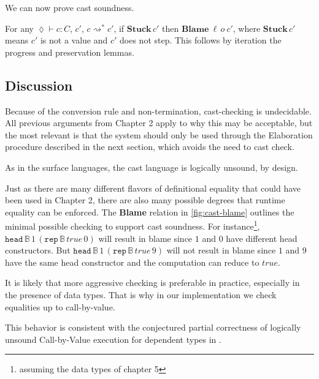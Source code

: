 
We can now prove cast soundness.

For any $\lozenge\vdash c:C$, $c'$, $c\rightsquigarrow^{*}c'$,
if $\textbf{Stuck}\,c'$ then $\textbf{Blame}\:\ensuremath{\ell}\,o\:c'$,
where $\textbf{Stuck}\,c'$ means $c'$ is not a value and $c'$ does
not step. This follows by iteration the progress and preservation
lemmas.

\subsection{Discussion}



Because of the conversion rule and non-termination, cast-checking
is undecidable. All previous arguments from Chapter 2 apply to why
this may be acceptable, but the most relevant is that the system should
only be used through the Elaboration procedure described in the next
section, which avoids the need to cast check.


As in the surface languages, the cast language is logically unsound,
by design.

Just as there are many different flavors of definitional equality
that could have been used in Chapter 2, there are also many possible
degrees that runtime equality can be enforced. The \textbf{Blame}
relation in \ref{fig:cast-blame} outlines the minimal possible checking
to support cast soundness. For instance\footnote{assuming the data types of chapter 5},
$\mathtt{head}\,\mathbb{B}\,1\,\left(\mathtt{rep}\,\mathbb{B}\,true\,0\right)$
will result in blame since $1$ and $0$ have different head constructors.
But $\mathtt{head}\,\mathbb{B}\,1\,\left(\mathtt{rep}\,\mathbb{B}\,true\,9\right)$
will not result in blame since $1$ and $9$ have the same head constructor
and the computation can reduce to $true$. 

It is likely that more aggressive checking is preferable in practice,
especially in the presence of data types. That is why in our implementation
we check equalities up to call-by-value. 

This behavior is consistent with the conjectured partial correctness
of logically unsound Call-by-Value execution for dependent types in
\cite{jia2010dependent}. 


